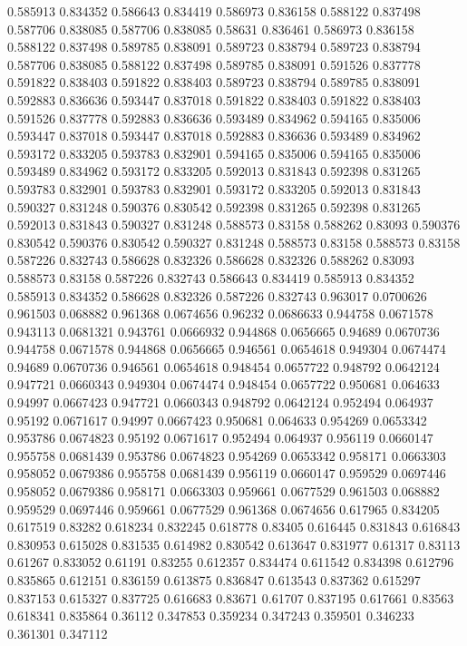 0.585913 0.834352
0.586643 0.834419
0.586973 0.836158
0.588122 0.837498
0.587706 0.838085
0.587706 0.838085
0.58631 0.836461
0.586973 0.836158
0.588122 0.837498
0.589785 0.838091
0.589723 0.838794
0.589723 0.838794
0.587706 0.838085
0.588122 0.837498
0.589785 0.838091
0.591526 0.837778
0.591822 0.838403
0.591822 0.838403
0.589723 0.838794
0.589785 0.838091
0.592883 0.836636
0.593447 0.837018
0.591822 0.838403
0.591822 0.838403
0.591526 0.837778
0.592883 0.836636
0.593489 0.834962
0.594165 0.835006
0.593447 0.837018
0.593447 0.837018
0.592883 0.836636
0.593489 0.834962
0.593172 0.833205
0.593783 0.832901
0.594165 0.835006
0.594165 0.835006
0.593489 0.834962
0.593172 0.833205
0.592013 0.831843
0.592398 0.831265
0.593783 0.832901
0.593783 0.832901
0.593172 0.833205
0.592013 0.831843
0.590327 0.831248
0.590376 0.830542
0.592398 0.831265
0.592398 0.831265
0.592013 0.831843
0.590327 0.831248
0.588573 0.83158
0.588262 0.83093
0.590376 0.830542
0.590376 0.830542
0.590327 0.831248
0.588573 0.83158
0.588573 0.83158
0.587226 0.832743
0.586628 0.832326
0.586628 0.832326
0.588262 0.83093
0.588573 0.83158
0.587226 0.832743
0.586643 0.834419
0.585913 0.834352
0.585913 0.834352
0.586628 0.832326
0.587226 0.832743
0.963017 0.0700626
0.961503 0.068882
0.961368 0.0674656
0.96232 0.0686633
0.944758 0.0671578
0.943113 0.0681321
0.943761 0.0666932
0.944868 0.0656665
0.94689 0.0670736
0.944758 0.0671578
0.944868 0.0656665
0.946561 0.0654618
0.949304 0.0674474
0.94689 0.0670736
0.946561 0.0654618
0.948454 0.0657722
0.948792 0.0642124
0.947721 0.0660343
0.949304 0.0674474
0.948454 0.0657722
0.950681 0.064633
0.94997 0.0667423
0.947721 0.0660343
0.948792 0.0642124
0.952494 0.064937
0.95192 0.0671617
0.94997 0.0667423
0.950681 0.064633
0.954269 0.0653342
0.953786 0.0674823
0.95192 0.0671617
0.952494 0.064937
0.956119 0.0660147
0.955758 0.0681439
0.953786 0.0674823
0.954269 0.0653342
0.958171 0.0663303
0.958052 0.0679386
0.955758 0.0681439
0.956119 0.0660147
0.959529 0.0697446
0.958052 0.0679386
0.958171 0.0663303
0.959661 0.0677529
0.961503 0.068882
0.959529 0.0697446
0.959661 0.0677529
0.961368 0.0674656
0.617965 0.834205
0.617519 0.83282
0.618234 0.832245
0.618778 0.83405
0.616445 0.831843
0.616843 0.830953
0.615028 0.831535
0.614982 0.830542
0.613647 0.831977
0.61317 0.83113
0.61267 0.833052
0.61191 0.83255
0.612357 0.834474
0.611542 0.834398
0.612796 0.835865
0.612151 0.836159
0.613875 0.836847
0.613543 0.837362
0.615297 0.837153
0.615327 0.837725
0.616683 0.83671
0.61707 0.837195
0.617661 0.83563
0.618341 0.835864
0.36112 0.347853
0.359234 0.347243
0.359501 0.346233
0.361301 0.347112
